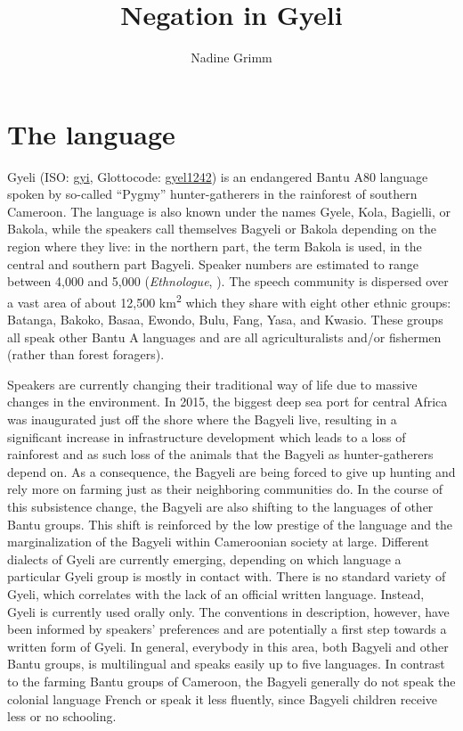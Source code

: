 \documentclass[output=paper,colorlinks=true, citecolor=brown,draftmode]{langscibook}
\author{Nadine Grimm\affiliation{University of Rochester}}
\title{Negation in Gyeli}
\begin{document}
\maketitle

\section{The language}

Gyeli (ISO: \href{https://iso639-3.sil.org/code/gyi}{gyi}, Glottocode: \href{https://glottolog.org/resource/languoid/id/gyel1242}{gyel1242}) is an endangered Bantu A80 language spoken by so-called ``Pygmy'' hunter-gatherers in the rainforest of southern Cameroon. The language is also known under the names Gyele, Kola, Bagielli, or Bakola, while the speakers call themselves Bagyeli or Bakola depending on the region where they live: in the northern part, the term Bakola is used, in the central and southern part Bagyeli. Speaker numbers are estimated to range between 4,000 and 5,000 ({\itshape Ethnologue}, \citealt{Ngima2001}). The speech community is dispersed over a vast area of about 12,500 km\textsuperscript{2} which they share with eight other ethnic groups: Batanga, Bakoko, Basaa, Ewondo, Bulu, Fang, Yasa, and Kwasio. These groups all speak other Bantu A languages and are all agriculturalists and/or fishermen (rather than forest foragers).

Speakers are currently changing their traditional way of life due to massive changes in the environment. In 2015, the biggest deep sea port for central Africa was inaugurated just off the shore where the Bagyeli live, resulting in a significant increase in infrastructure development which leads to a loss of rainforest and as such loss of the animals that the Bagyeli as hunter-gatherers depend on. As a consequence, the Bagyeli are being forced to give up hunting and rely more on farming just as their neighboring communities do. In the course of this subsistence change, the Bagyeli are also shifting to the languages of other Bantu groups. This shift is reinforced by the low prestige of the language and the marginalization of the Bagyeli within Cameroonian society at large. Different dialects of Gyeli are currently emerging, depending on which language a particular Gyeli group is mostly in contact with. There is no standard variety of Gyeli, which correlates with the lack of an official written language. Instead, Gyeli is currently used orally only. The conventions in  description, however, have been informed by speakers' preferences and are potentially a first step towards a written form of Gyeli.  In general, everybody in this area, both Bagyeli and other Bantu groups, is multilingual and speaks easily up to five languages. In contrast to the farming Bantu groups of Cameroon, the Bagyeli generally do not speak the colonial language French or speak it less fluently, since Bagyeli children receive less or no schooling.  
\end{document}
